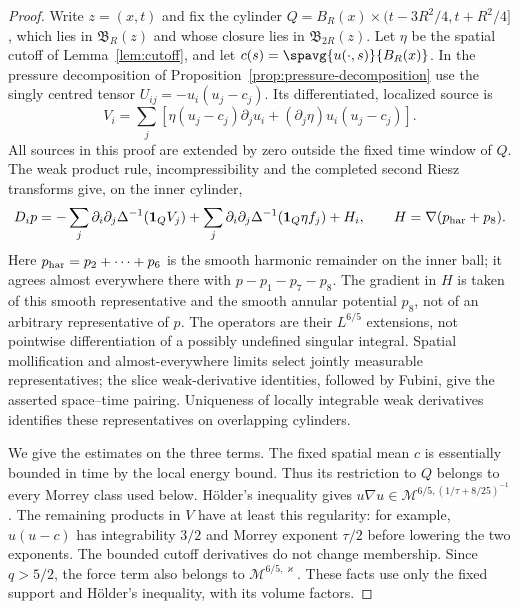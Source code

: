 \documentclass[11pt,reqno]{amsart}
\begin{document}
\begin{proof}
Write $z=(x,t)$ and fix the cylinder
$Q=B_R(x)\times(t-3R^2/4,t+R^2/4]$, which lies in
$\mathfrak B_R(z)$ and whose closure lies in $\mathfrak B_{2R}(z)$.
Let $\eta$ be the spatial cutoff of Lemma~\ref{lem:cutoff}, and let
$c(s)=\spavg{u(\cdot,s)}{B_R(x)}$.
In the pressure decomposition of Proposition~\ref{prop:pressure-decomposition}
use the singly centred tensor $U_{ij}=-u_i(u_j-c_j)$. Its differentiated,
localized source is
\[
 V_i=\sum_j\left[\eta(u_j-c_j)\partial_j u_i
                    +(\partial_j\eta)u_i(u_j-c_j)\right].
\]
All sources in this proof are extended by zero outside the fixed time
window of $Q$. The weak product rule, incompressibility and the completed
second Riesz transforms give, on the inner cylinder,
\begin{equation}\label{eq:pressure-gradient-decomposition}
 D_i p=-\sum_j\partial_i\partial_j\Delta^{-1}(\mathbf1_Q V_j)
       +\sum_j\partial_i\partial_j\Delta^{-1}(\mathbf1_Q\eta f_j)+H_i,
 \qquad H=\nabla(p_{\rm har}+p_8).
\end{equation}
Here $p_{\rm har}=p_2+\cdots+p_6$ is the smooth harmonic remainder on
the inner ball; it agrees almost everywhere there with $p-p_1-p_7-p_8$.
The gradient in $H$ is taken of this smooth representative and the smooth
annular potential $p_8$, not of an arbitrary representative of $p$.
The operators are their $L^{6/5}$ extensions, not pointwise
differentiation of a possibly undefined singular integral. Spatial
mollification and almost-everywhere limits select jointly measurable
representatives; the slice weak-derivative identities, followed by Fubini,
give the asserted space--time pairing. Uniqueness of locally integrable
weak derivatives identifies these representatives on overlapping cylinders.

We give the estimates on the three terms. The fixed spatial mean $c$ is
essentially bounded in time by the local energy bound. Thus its restriction to $Q$
belongs to every Morrey class used below. H\"older's inequality gives
$u\nabla u\in\mathcal M^{6/5,(1/\tau+8/25)^{-1}}$.
The remaining products in $V$ have at least this regularity: for example,
$u(u-c)$ has integrability $3/2$ and Morrey exponent $\tau/2$ before
lowering the two exponents. The bounded cutoff derivatives do not change
membership. Since $q>5/2$, the force term also belongs to
$\mathcal M^{6/5,\varkappa}$. These facts use only the fixed support and
H\"older's inequality, with its volume factors.


\end{proof}
\end{document}
